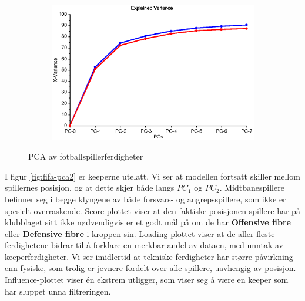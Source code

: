 \begin{figure}[h]
\begin{subfigure}[t]{0.48\textwidth}
 		\caption{}
 		\label{}
 	\end{subfigure}
 	\begin{subfigure}[t]{0.48\textwidth}
 		\centering
 		\includegraphics[width=\textwidth]{figurer/fifa-pca1-ev}
 		\caption{}
 		\label{}
 	\end{subfigure}
	\label{fig:fifa-pca1}
	\caption{PCA av fotballspillerferdigheter}
 \end{figure}

 I figur \ref{fig:fifa-pca2} er keeperne utelatt. Vi ser at modellen fortsatt skiller mellom spillernes posisjon, og at dette skjer både langs $PC_1$ og $PC_2$. Midtbanespillere befinner seg i begge klyngene av både forsvars- og angrepsspillere, som ikke er spesielt overraskende. Score-plottet viser at den faktiske posisjonen spillere har på klubblaget sitt ikke nødvendigvis er et godt mål på om de har \textbf{Offensive fibre\texttrademark} eller \textbf{Defensive fibre\texttrademark} i kroppen sin. Loading-plottet viser at de aller fleste ferdighetene bidrar til å forklare en merkbar andel av dataen, med unntak av keeperferdigheter. Vi ser imidlertid at tekniske ferdigheter har større påvirkning enn fysiske, som trolig er jevnere fordelt over alle spillere, uavhengig av posisjon. Influence-plottet viser én ekstrem utligger, som viser seg å være en keeper som har sluppet unna filtreringen.

